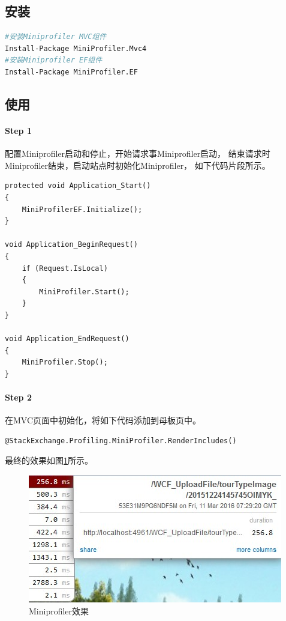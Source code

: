 \documentclass{book}
\begin{document}
\subsection{安装}

\begin{lstlisting}[language=Bash]
#安装Miniprofiler MVC组件
Install-Package MiniProfiler.Mvc4
#安装Miniprofiler EF组件
Install-Package MiniProfiler.EF
\end{lstlisting}

\subsection{使用}

\paragraph{Step 1}配置Miniprofiler启动和停止，开始请求事Miniprofiler启动，
结束请求时Miniprofiler结束，启动站点时初始化Miniprofiler，
如下代码片段所示。

\begin{lstlisting}[language={[Sharp]C}]
protected void Application_Start()
{    
    MiniProfilerEF.Initialize();
}

void Application_BeginRequest()
{
    if (Request.IsLocal)
    {
        MiniProfiler.Start();
    }
}

void Application_EndRequest()
{
    MiniProfiler.Stop();
}
\end{lstlisting}

\paragraph{Step 2}在MVC页面中初始化，将如下代码添加到母板页中。

\begin{lstlisting}[language={[Sharp]C}]
@StackExchange.Profiling.MiniProfiler.RenderIncludes()
\end{lstlisting}

最终的效果如图\ref{fig:MiniprofilerEffect}所示。

\begin{figure}[htbp]
	\centering
	\includegraphics[scale=0.8]{MiniprofilerEffect.jpg}
	\caption{Miniprofiler效果}
	\label{fig:MiniprofilerEffect}
\end{figure}
\end{document}
